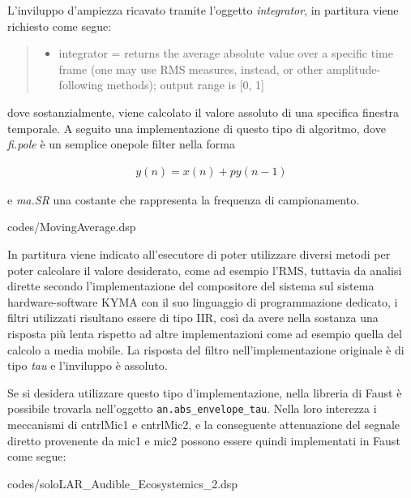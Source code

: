 L'inviluppo d'ampiezza ricavato tramite l'oggetto \textit{integrator}, in partitura 
viene richiesto come segue:

\begin{quote}
\begin{itemize}
  \item integrator = returns the average absolute value over a specific 
    time frame (one may use RMS measures, instead, or other amplitude-following methods); 
    output range is [0, 1]
\end{itemize}
\end{quote}

dove sostanzialmente, viene calcolato il valore assoluto di una specifica finestra temporale. 
A seguito una implementazione di questo tipo di algoritmo, dove \textit{fi.pole} è 
un semplice onepole filter nella forma

\begin{align*} 
    y(n) = x(n) + py(n-1)
\end{align*}

e \textit{ma.SR} una costante che rappresenta la frequenza di campionamento.

\vspace{0.5cm} 

{codes/MovingAverage.dsp}

In partitura viene indicato all'esecutore di poter utilizzare diversi metodi 
per poter calcolare il valore desiderato, come ad esempio l'RMS, 
tuttavia da analisi dirette secondo l'implementazione del compositore del sistema sul 
sistema hardware-software KYMA con il suo linguaggio di programmazione dedicato, 
i filtri utilizzati risultano essere di tipo IIR,
così da avere nella sostanza una risposta più lenta rispetto ad altre implementazioni come ad esempio 
quella del calcolo a media mobile.  
La risposta del filtro nell'implementazione originale è di tipo \textit{tau} 
e l'inviluppo è assoluto.

Se si desidera utilizzare questo tipo d'implementazione, nella libreria di Faust 
è possibile trovarla nell'oggetto \verb|an.abs_envelope_tau|.
Nella loro interezza i meccanismi di cntrlMic1 e cntrlMic2, e la conseguente
attenuazione del segnale diretto provenente da mic1 e mic2 
possono essere quindi implementati in Faust come segue:

\vspace{0.5cm} 

{codes/soloLAR_Audible_Ecosystemics_2.dsp}

